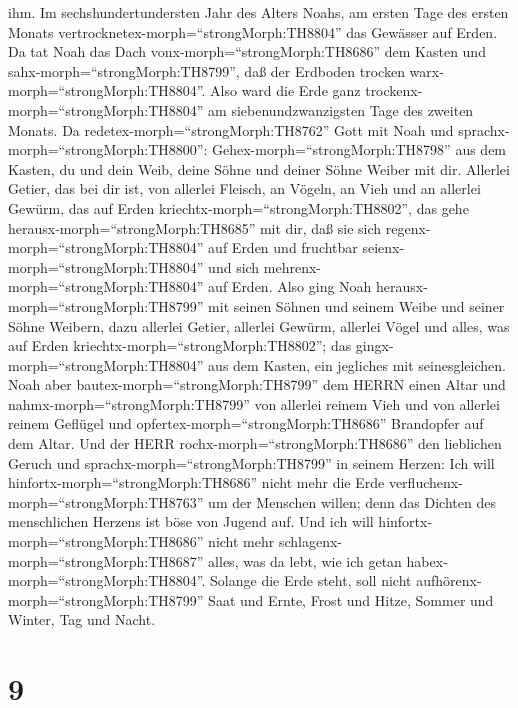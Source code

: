 ihm.  Im sechshundertundersten Jahr des Alters Noahs, am
ersten Tage des ersten Monats vertrocknetex-morph=``strongMorph:TH8804''
das Gewässer auf Erden. Da tat Noah das Dach
vonx-morph=``strongMorph:TH8686'' dem Kasten und
sahx-morph=``strongMorph:TH8799'', daß der Erdboden trocken
warx-morph=``strongMorph:TH8804''.  Also ward die Erde ganz
trockenx-morph=``strongMorph:TH8804'' am siebenundzwanzigsten Tage des
zweiten Monats.  Da redetex-morph=``strongMorph:TH8762''
Gott mit Noah und sprachx-morph=``strongMorph:TH8800'': 
Gehex-morph=``strongMorph:TH8798'' aus dem Kasten, du und dein Weib,
deine Söhne und deiner Söhne Weiber mit dir.  Allerlei
Getier, das bei dir ist, von allerlei Fleisch, an Vögeln, an Vieh und an
allerlei Gewürm, das auf Erden kriechtx-morph=``strongMorph:TH8802'',
das gehe herausx-morph=``strongMorph:TH8685'' mit dir, daß sie sich
regenx-morph=``strongMorph:TH8804'' auf Erden und fruchtbar
seienx-morph=``strongMorph:TH8804'' und sich
mehrenx-morph=``strongMorph:TH8804'' auf Erden.  Also ging
Noah herausx-morph=``strongMorph:TH8799'' mit seinen Söhnen und seinem
Weibe und seiner Söhne Weibern,  dazu allerlei Getier,
allerlei Gewürm, allerlei Vögel und alles, was auf Erden
kriechtx-morph=``strongMorph:TH8802''; das
gingx-morph=``strongMorph:TH8804'' aus dem Kasten, ein jegliches mit
seinesgleichen.  Noah aber
bautex-morph=``strongMorph:TH8799'' dem HERRN einen Altar und
nahmx-morph=``strongMorph:TH8799'' von allerlei reinem Vieh und von
allerlei reinem Geflügel und opfertex-morph=``strongMorph:TH8686''
Brandopfer auf dem Altar.  Und der HERR
rochx-morph=``strongMorph:TH8686'' den lieblichen Geruch und
sprachx-morph=``strongMorph:TH8799'' in seinem Herzen: Ich will
hinfortx-morph=``strongMorph:TH8686'' nicht mehr die Erde
verfluchenx-morph=``strongMorph:TH8763'' um der Menschen willen; denn
das Dichten des menschlichen Herzens ist böse von Jugend auf. Und ich
will hinfortx-morph=``strongMorph:TH8686'' nicht mehr
schlagenx-morph=``strongMorph:TH8687'' alles, was da lebt, wie ich getan
habex-morph=``strongMorph:TH8804''.  Solange die Erde
steht, soll nicht aufhörenx-morph=``strongMorph:TH8799'' Saat und Ernte,
Frost und Hitze, Sommer und Winter, Tag und Nacht.

\hypertarget{section-8}{%
\section{9}\label{section-8}}


